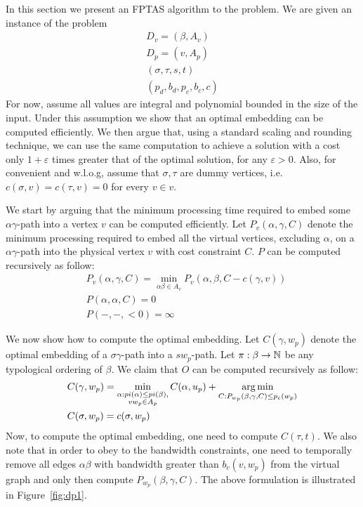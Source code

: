 In this section we present an FPTAS algorithm to the \VPN{} problem.
We are given an instance of the \VPN{} problem 
\begin{align*}
D_v = (\beta , A_v)		\\
D_p = (v, A_p)		\\
(\sigma , \tau , s, t)	\\
(p_d, b_d, p_c, b_c, c)
\end{align*}
For now, assume all values are integral and polynomial bounded in the size of
the input.
Under this assumption we show that an optimal embedding can be computed
efficiently.
We then argue that, using a standard scaling and rounding technique, we can use
the same computation to achieve a solution with a cost only
$1 + \varepsilon$ times greater that of the optimal solution, for any
$\varepsilon > 0$.
Also, for convenient and w.l.o.g, assume that $\sigma , \tau $ are dummy vertices, 
i.e. $c(\sigma , v) = c(\tau , v) = 0$ for every $v \in v$.

We start by arguing that the minimum processing time required to embed some
$\alpha \gamma $-path into a vertex $v$ can be computed efficiently.
Let $P_{v}(\alpha , \gamma , C)$ denote the minimum processing required to embed
all the virtual vertices, excluding $\alpha $, on a $\alpha \gamma $-path into the physical
vertex $v$ with cost constraint $C$.
$P$ can be computed recursively as follow:
\begin{align*}
&P_{v}(\alpha , \gamma , C) = 
\min_{\alpha \beta  \in A_v} P_{v}(\alpha , \beta , C - c(\gamma , v))
\\
&P(\alpha , \alpha , C) = 0
\\
&P(-, -, <0) = \infty
\end{align*}
 
We now show how to compute the optimal embedding.
Let $C(\gamma , w_p)$ denote the
optimal embedding of a $\sigma \gamma $-path into a $sw_p$-path.
Let $\pi:\beta  \to \mathbb{N}$ be any typological ordering of $\beta $. 
We claim that $O$ can be computed recursively as follow:
\begin{align*}
&C(\gamma , w_p) = 
\min_{\substack{
\alpha  : pi(\alpha ) \leq pi(\beta ), 
\\
vw_p \in A_p
}}
C(\alpha , u_p)
+
\operatorname*{arg\,min}_{C : P_{w_p}(\beta , \gamma , C) \leq p_c(w_p)}
\\
&C(\sigma , w_p) = c(\sigma , w_p)
\end{align*}
Now, to compute the optimal embedding, one need to compute $C(\tau , t)$. 
We also note that in order to obey to the bandwidth constraints, 
one need to temporally remove all edges $\alpha \beta $ with bandwidth greater than
$b_c(v, w_p)$ from the virtual graph and only then compute $P_{w_p}(\beta , \gamma , C)$.
The above formulation is illustrated in Figure~\ref{fig:dp1}.

